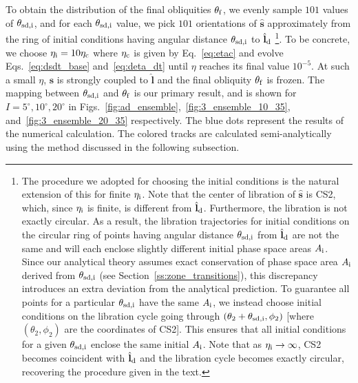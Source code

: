 \documentclass[
        fleqn,
        usenatbib,
    ]{mnras}
\newcommand*{\bm}[1]{\boldsymbol{\mathbf{#1}}}
\newcommand*{\uv}[1]{\hat{\bm{#1}}}
\newcommand*{\p}[1]{\left(#1\right)}
\begin{document}
To obtain the distribution of the final obliquities $\theta_{\rm f}$, we evenly
sample $101$ values of $\theta_{\rm sd, i}$, and for each $\theta_{\rm sd, i}$
value, we pick $101$ orientations of $\uv{s}$ approximately from the ring of
initial conditions having angular distance $\theta_{\rm sd, i}$ to $\uv{l}_{\rm
d}$%
%
\footnote{The procedure we adopted for choosing the initial conditions is the
natural extension of this for finite $\eta_{\rm i}$. Note that the center of
libration of $\uv{s}$ is CS2, which, since $\eta_{\rm i}$ is finite, is
different from $\uv{l}_{\rm d}$. Furthermore, the libration is not exactly
circular. As a result, the libration trajectories for initial conditions on the
circular ring of points having angular distance $\theta_{\rm sd, i}$ from
$\uv{l}_{\rm d}$ are not the same and will each enclose slightly different
initial phase space areas $A_{\rm i}$. Since our analytical theory assumes exact
conservation of phase space area $A_{\rm i}$ derived from $\theta_{\rm sd, i}$
(see Section~\ref{ss:zone_transitions}), this discrepancy introduces an extra
deviation from the analytical prediction. To guarantee all points for a
particular $\theta_{\rm sd, i}$ have the same $A_{\rm i}$, we instead choose
initial conditions on the libration cycle going through $\p{\theta_2 +
\theta_{\rm sd, i}, \phi_2}$ [where $\p{\theta_2, \phi_2}$ are the coordinates
of CS2]. This ensures that all initial conditions for a given $\theta_{\rm sd,
i}$ enclose the same initial $A_{\rm i}$. Note that as $\eta_{\rm i} \to
\infty$, CS2 becomes coincident with $\uv{l}_{\rm d}$ and the libration cycle
becomes exactly circular, recovering the procedure given in the text.}.
%
To be concrete, we choose $\eta_{\rm i} = 10\eta_{\rm c}$ where $\eta_{\rm c}$
is given by Eq.~\eqref{eq:etac} and evolve Eqs.~\eqref{eq:dsdt_base}
and~\eqref{eq:deta_dt} until $\eta$ reaches its final value $10^{-5}$. At such a
small $\eta$, $\uv{s}$ is strongly coupled to $\uv{l}$ and the final obliquity
$\theta_{\rm f}$ is frozen. The mapping between $\theta_{\rm sd, i}$ and
$\theta_{\rm f}$ is our primary result, and is shown for $I = 5^\circ, 10^\circ,
20^\circ$ in Figs.~\ref{fig:ad_ensemble},~\ref{fig:3_ensemble_10_35},
and~\ref{fig:3_ensemble_20_35} respectively. The blue dots represent the results
of the numerical calculation. The colored tracks are calculated
semi-analytically using the method discussed in the following subsection.
\end{document}
